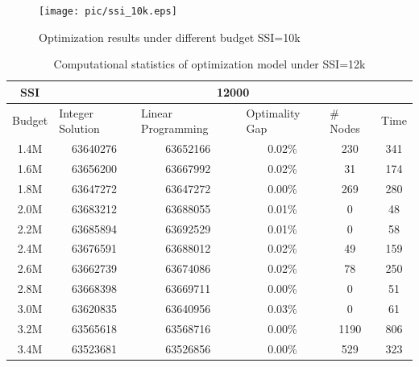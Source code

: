 \documentclass[12pt,english]{report}
\begin{document}
\begin{figure}[ht]
    \centering    
    \texttt{[image: pic/ssi\_10k.eps]}
    \caption{Optimization results under different budget SSI=10k }
    \label{ssi_10k_plot}
\end{figure}



\begin{table}[ht]
\centering
\caption{Computational statistics of optimization model under SSI=12k}
\label{ssi12k}
\begin{tabular}{|c|c|c|c|c|c|}
\hline
SSI     & \multicolumn{5}{c|}{12000}                      
\\ \hline
\multicolumn{1}{|l|}{Budget} & \multicolumn{1}{l|}{Integer Solution} &
\multicolumn{1}{l|}{Linear Programming} & \multicolumn{1}{l|}{Optimality Gap} &
\multicolumn{1}{l|}{\# Nodes} & \multicolumn{1}{l|}{Time} \\
\hline
1.4M   & 63640276         & 63652166           & 0.02\%         & 230          
& 341  \\ \hline
1.6M   & 63656200         & 63667992           & 0.02\%         & 31           
& 174  \\ \hline
1.8M   & 63647272         & 63647272           & 0.00\%         & 269          
& 280  \\ \hline
2.0M   & 63683212         & 63688055           & 0.01\%         & 0            
& 48   \\ \hline
2.2M   & 63685894         & 63692529           & 0.01\%         & 0            
& 58   \\ \hline
2.4M   & 63676591         & 63688012           & 0.02\%         & 49           
& 159  \\ \hline
2.6M   & 63662739         & 63674086           & 0.02\%         & 78           
& 250  \\ \hline
2.8M   & 63668398         & 63669711           & 0.00\%         & 0            
& 51   \\ \hline
3.0M   & 63620835         & 63640956           & 0.03\%         & 0            
& 61   \\ \hline
3.2M   & 63565618         & 63568716           & 0.00\%         & 1190         
& 806  \\ \hline
3.4M   & 63523681         & 63526856           & 0.00\%          & 529 
& 323  \\ \hline
\end{tabular}
\end{table}
\end{document}
